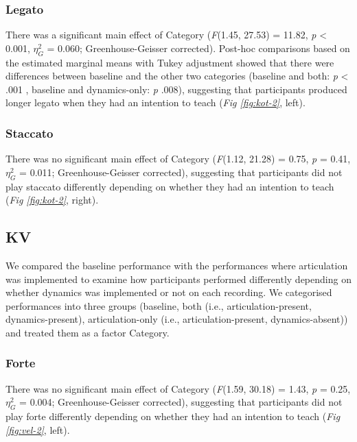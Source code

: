 \documentclass[
  man]{apa6}
\begin{document}
\hypertarget{legato-1}{%
\subsubsection{Legato}\label{legato-1}}

There was a significant main effect of Category (\emph{F}(1.45, 27.53) = 11.82, \emph{p} \textless{} 0.001, \(\eta_G^2\) = 0.060; Greenhouse-Geisser corrected). Post-hoc comparisons based on the estimated marginal means with Tukey adjustment showed that there were differences between baseline and the other two categories (baseline and both: \emph{p} \textless{} .001 , baseline and dynamics-only: \emph{p} .008), suggesting that participants produced longer legato when they had an intention to teach (\emph{Fig \ref{fig:kot-2}}, left).

\hypertarget{staccato-1}{%
\subsubsection{Staccato}\label{staccato-1}}

There was no significant main effect of Category (\emph{F}(1.12, 21.28) = 0.75, \emph{p} = 0.41, \(\eta_G^2\) = 0.011; Greenhouse-Geisser corrected), suggesting that participants did not play staccato differently depending on whether they had an intention to teach (\emph{Fig \ref{fig:kot-2}}, right).

\hypertarget{kv-1}{%
\subsection{KV}\label{kv-1}}

We compared the baseline performance with the performances where articulation was implemented to examine how participants performed differently depending on whether dynamics was implemented or not on each recording. We categorised performances into three groups (baseline, both (i.e., articulation-present, dynamics-present), articulation-only (i.e., articulation-present, dynamics-absent)) and treated them as a factor Category.

\hypertarget{forte-1}{%
\subsubsection{Forte}\label{forte-1}}

There was no significant main effect of Category (\emph{F}(1.59, 30.18) = 1.43, \emph{p} = 0.25, \(\eta_G^2\) = 0.004; Greenhouse-Geisser corrected), suggesting that participants did not play forte differently depending on whether they had an intention to teach (\emph{Fig \ref{fig:vel-2}}, left).
\end{document}
